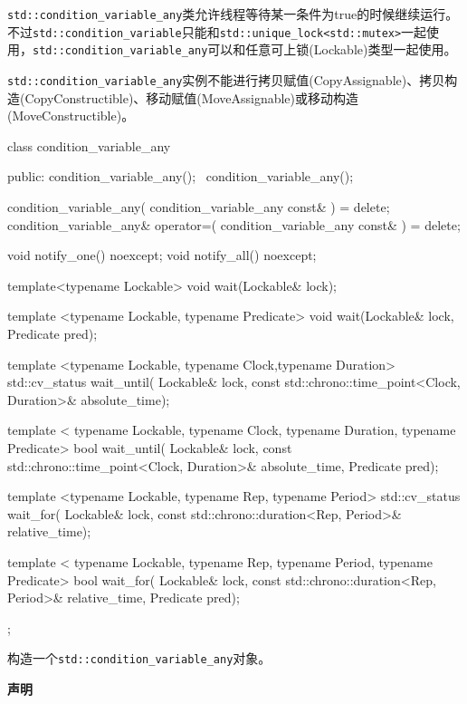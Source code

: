 
\texttt{std::condition\_variable\_any}类允许线程等待某一条件为true的时候继续运行。不过\texttt{std::condition\_variable}只能和\texttt{std::unique\_lock<std::mutex>}一起使用，\texttt{std::condition\_variable\_any}可以和任意可上锁(Lockable)类型一起使用。

\texttt{std::condition\_variable\_any}实例不能进行拷贝赋值(CopyAssignable)、拷贝构造(CopyConstructible)、移动赋值(MoveAssignable)或移动构造(MoveConstructible)。


\begin{cpp}
class condition_variable_any
{
public:
  condition_variable_any();
  ~condition_variable_any();

  condition_variable_any(
      condition_variable_any const& ) = delete;
  condition_variable_any& operator=(
      condition_variable_any const& ) = delete;

  void notify_one() noexcept;
  void notify_all() noexcept;

  template<typename Lockable>
  void wait(Lockable& lock);

  template <typename Lockable, typename Predicate>
  void wait(Lockable& lock, Predicate pred);

  template <typename Lockable, typename Clock,typename Duration>
  std::cv_status wait_until(
      Lockable& lock,
      const std::chrono::time_point<Clock, Duration>& absolute_time);

  template <
      typename Lockable, typename Clock,
      typename Duration, typename Predicate>
  bool wait_until(
      Lockable& lock,
      const std::chrono::time_point<Clock, Duration>& absolute_time,
      Predicate pred);

  template <typename Lockable, typename Rep, typename Period>
  std::cv_status wait_for(
      Lockable& lock,
      const std::chrono::duration<Rep, Period>& relative_time);

  template <
      typename Lockable, typename Rep,
      typename Period, typename Predicate>
  bool wait_for(
      Lockable& lock,
      const std::chrono::duration<Rep, Period>& relative_time,
      Predicate pred);
};
\end{cpp}


构造一个\texttt{std::condition\_variable\_any}对象。

\textbf{声明}

